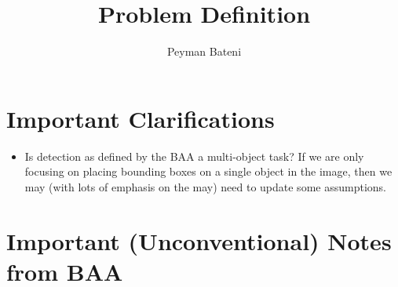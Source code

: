 \documentclass{article}
\title{Problem Definition}
\author{Peyman Bateni}
\begin{document}
\maketitle

\section{Important Clarifications}
\begin{itemize}
    \item Is detection as defined by the BAA a multi-object task? If we are only focusing on placing bounding boxes on a single object in the image, then we may (with lots of emphasis on the may) need to update some assumptions.
\end{itemize}

\section{Important (Unconventional) Notes from BAA}
\end{document}
